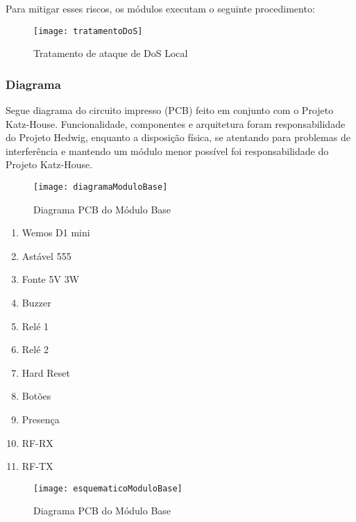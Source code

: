 Para mitigar esses riscos, os módulos executam o seguinte procedimento:
\begin{figure}[H]
	\centering
	\caption{Tratamento de ataque de DoS Local}
  \texttt{[image: tratamentoDoS]}
\label{fig:tratamentoDoS}
\end{figure}

\subsubsection{Diagrama}
Segue diagrama do circuito impresso (PCB) feito em conjunto com o Projeto Katz-House. Funcionalidade, componentes e arquitetura foram responsabilidade do Projeto Hedwig, enquanto a disposição física, se atentando para problemas de interferência e mantendo um módulo menor possível foi responsabilidade do Projeto Katz-House.

\begin{figure}[H]
	\centering
	\caption{Diagrama PCB do Módulo Base}
  \texttt{[image: diagramaModuloBase]}
\label{fig:diagramaModuloBase}
\end{figure}

\begin{enumerate}
\item Wemos D1 mini
\item Astável 555
\item Fonte 5V 3W
\item Buzzer
\item Relé 1
\item Relé 2
\item Hard Reset
\item Botões
\item Presença
\item RF-RX
\item RF-TX
\end{enumerate}

\begin{figure}[H]
	\centering
	\caption{Diagrama PCB do Módulo Base}
  \texttt{[image: esquematicoModuloBase]}
\label{fig:esquematicoModuloBase}
\end{figure}

